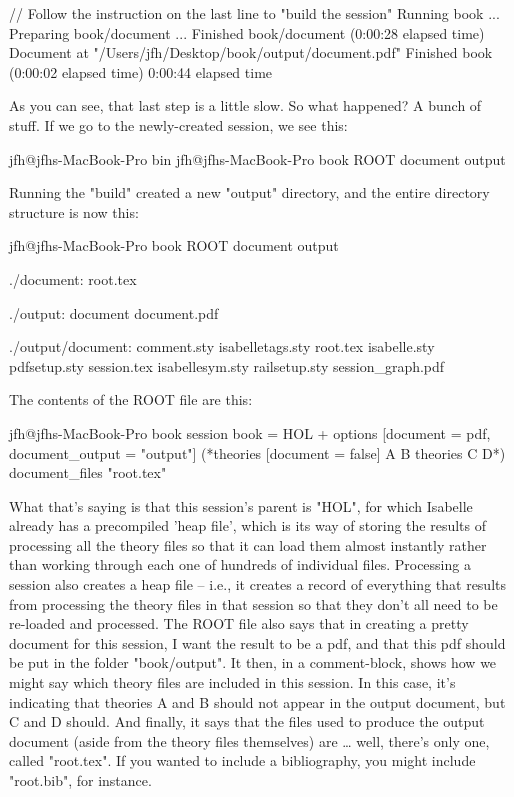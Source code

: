         // Follow the instruction on the last line to "build the session"
Running book ...
Preparing book/document ...
Finished book/document (0:00:28 elapsed time)
Document at "/Users/jfh/Desktop/book/output/document.pdf"
Finished book (0:00:02 elapsed time)
0:00:44 elapsed time

As you can see, that last step is a little slow. So what happened? A bunch of stuff. If we go to the newly-created session, we see this:

jfh@jfhs-MacBook-Pro bin %
jfh@jfhs-MacBook-Pro book %
ROOT		document	output


Running the "build" created a new "output" directory, and the entire directory structure is now this:

jfh@jfhs-MacBook-Pro book %
ROOT		document	output

./document:
root.tex

./output:
document	document.pdf

./output/document:
comment.sty			isabelletags.sty		root.tex
isabelle.sty		pdfsetup.sty		session.tex
isabellesym.sty		railsetup.sty		session_graph.pdf

The contents of the ROOT file are this:

jfh@jfhs-MacBook-Pro book %
session book = HOL +
  options [document = pdf, document_output = "output"]
(*theories [document = false]
    A
    B
  theories
    C
    D*)
  document_files
    "root.tex"

What that's saying is that this session's parent is "HOL", for which Isabelle already has a precompiled 'heap file', which is its way of storing the results of processing all the theory files so that it can load them almost instantly rather than working through each one of hundreds of individual files. Processing a session also creates a heap file -- i.e., it creates a record of everything that results from processing the theory files in that session so that they don't all need to be re-loaded and processed. The ROOT file also says that in creating a pretty document for this session, I want the result to be a pdf, and that this pdf should be put in the folder "book/output". It then, in a comment-block, shows how we might say which theory files are included in this session. In this case, it's indicating that theories A and B should not appear in the output document, but C and D should. And finally, it says that the files used to produce the output document (aside from the theory files themselves) are … well, there's only one, called "root.tex". If you wanted to include a bibliography, you might include "root.bib", for instance. 

